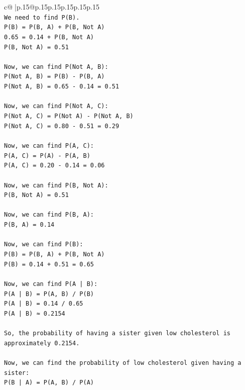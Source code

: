 \documentclass{article}
\begin{document}
{\begin{supertabular}{c@{$\;$}|p{.15\linewidth}@{}p{.15\linewidth}p{.15\linewidth}p{.15\linewidth}p{.15\linewidth}p{.15\linewidth}}
{{{\\ 
\texttt{We need to find P(B).} \\
\texttt{P(B) = P(B, A) + P(B, Not A)} \\
\texttt{0.65 = 0.14 + P(B, Not A)} \\
\texttt{P(B, Not A) = 0.51} \\
\\ 
\texttt{Now, we can find P(Not A, B):} \\
\texttt{P(Not A, B) = P(B) {-} P(B, A)} \\
\texttt{P(Not A, B) = 0.65 {-} 0.14 = 0.51} \\
\\ 
\texttt{Now, we can find P(Not A, C):} \\
\texttt{P(Not A, C) = P(Not A) {-} P(Not A, B)} \\
\texttt{P(Not A, C) = 0.80 {-} 0.51 = 0.29} \\
\\ 
\texttt{Now, we can find P(A, C):} \\
\texttt{P(A, C) = P(A) {-} P(A, B)} \\
\texttt{P(A, C) = 0.20 {-} 0.14 = 0.06} \\
\\ 
\texttt{Now, we can find P(B, Not A):} \\
\texttt{P(B, Not A) = 0.51} \\
\\ 
\texttt{Now, we can find P(B, A):} \\
\texttt{P(B, A) = 0.14} \\
\\ 
\texttt{Now, we can find P(B):} \\
\texttt{P(B) = P(B, A) + P(B, Not A)} \\
\texttt{P(B) = 0.14 + 0.51 = 0.65} \\
\\ 
\texttt{Now, we can find P(A | B):} \\
\texttt{P(A | B) = P(A, B) / P(B)} \\
\texttt{P(A | B) = 0.14 / 0.65} \\
\texttt{P(A | B) ≈ 0.2154} \\
\\ 
\texttt{So, the probability of having a sister given low cholesterol is approximately 0.2154.} \\
\\ 
\texttt{Now, we can find the probability of low cholesterol given having a sister:} \\
\texttt{P(B | A) = P(A, B) / P(A)} \\
}}}
\end{supertabular}}
\end{document}
